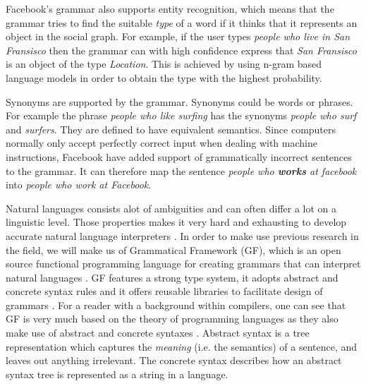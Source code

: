 Facebook's grammar also supports entity recognition, which means that the grammar tries to find the suitable \emph{type} of a word if it thinks that it represents an object in the social graph. For example, if the user types \emph{people who live in San Fransisco} then the grammar can with high confidence express that \emph{San Fransisco} is an object of the type \emph{Location}. This is achieved by using n-gram based language models in order to obtain the type with the highest probability.

Synonyms are supported by the grammar. Synonyms could be words or phrases. For example the phrase \emph{people who like surfing} has the synonyms \emph{people who surf} and \emph{surfers}. They are defined to have equivalent semantics.
\newline
\newline
Since computers normally only accept perfectly correct input when dealing with machine instructions, Facebook have added support of grammatically incorrect sentences to the grammar. It can therefore map the sentence \emph{people who \textbf{works} at facebook} into \emph{people who work at Facebook}.

\label{sec:gf}
Natural languages consists alot of ambiguities and can often differ a lot on a linguistic level. Those properties makes it very hard and exhausting to develop accurate natural language interpreters \cite{kaufmann:2007}. In order to make use previous research in the field, we will make us of Grammatical Framework (GF), which is an open source functional programming language for creating grammars that can interpret natural languages \cite[p. 1]{ranta:2011}. GF features a strong type system, it adopts abstract and concrete syntax rules and it offers reusable libraries to facilitate design of grammars \cite{gf-rgl}. For a reader with a background within compilers, one can see that GF is very much based on the theory of programming languages as they also make use of abstract and concrete syntaxes \cite[pp. 69-70]{Aho:1986:CPT:6448}.
\newline
\newline
Abstract syntax is a tree representation which captures the \emph{meaning} (i.e. the semantics) of a sentence, and leaves out anything irrelevant. The concrete syntax describes how an abstract syntax tree is represented as a string in a language.

